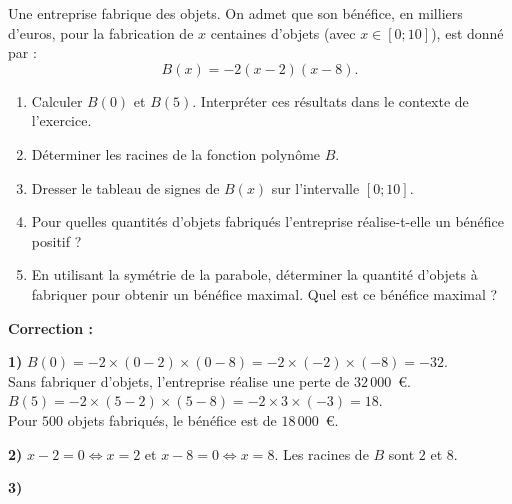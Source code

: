\documentclass[11pt,a4paper]{book}
\begin{document}
\exerciceDS{}

Une entreprise fabrique des objets. On admet que son bénéfice, en milliers d'euros, pour la fabrication de $x$ centaines d'objets (avec $x\in[0 ; 10]$), est donné par :
$$B(x)=-2(x-2)(x-8).$$

\begin{enumerate}[label=\textbf{\arabic*)}]
	\item Calculer $B(0)$ et $B(5)$. Interpréter ces résultats dans le contexte de l'exercice.
	\item Déterminer les racines de la fonction polynôme $B$.
	\item Dresser le tableau de signes de $B(x)$ sur l'intervalle $[0 ; 10]$.
	\item Pour quelles quantités d'objets fabriqués l'entreprise réalise-t-elle un bénéfice positif ?
	\item En utilisant la symétrie de la parabole, déterminer la quantité d'objets à fabriquer pour obtenir un bénéfice maximal. Quel est ce bénéfice maximal ?
\end{enumerate}

\medskip
\noindent\textbf{\color{red!75!black}Correction :}

\smallskip
\begin{corrBox}
	\textbf{1)} $B(0)=-2\times(0-2)\times(0-8)=-2\times(-2)\times(-8)=-32$.\\
	Sans fabriquer d'objets, l'entreprise réalise une perte de $32\,000$~\euro.\\[0.1cm]
	$B(5)=-2\times(5-2)\times(5-8)=-2\times3\times(-3)=18$.\\
	Pour $500$ objets fabriqués, le bénéfice est de $18\,000$~\euro.
\end{corrBox}

\medskip
\begin{corrBox}
	\textbf{2)} $x-2=0 \iff x=2$ \quad et \quad $x-8=0 \iff x=8$. Les racines de $B$ sont $2$ et $8$.
\end{corrBox}

\medskip
\begin{corrBox}
	\textbf{3)}
	\begin{center}
	\end{center}
\end{corrBox}
\end{document}
